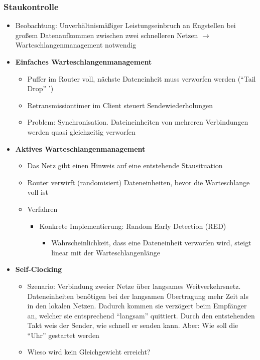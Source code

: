 \subsubsection{Staukontrolle}
\begin{itemize}
	\item Beobachtung: Unverhältnismäßiger Leistungseinbruch an Engstellen bei großem Datenaufkommen zwischen zwei schnelleren Netzen \(\rightarrow\) Warteschlangenmanagement notwendig
	\item \textbf{Einfaches Warteschlangenmanagement}
	\begin{itemize}
		\item Puffer im Router voll, nächste Dateneinheit muss verworfen werden ("`Tail Drop"'
		')
		\item Retransmissiontimer im Client steuert Sendewiederholungen
		\item Problem: Synchronisation. Dateineinheiten von mehreren Verbindungen werden quasi gleichzeitig verworfen
	\end{itemize}
	\item \textbf{Aktives Warteschlangenmanagement}
	\begin{itemize}
		\item Das Netz gibt einen Hinweis auf eine entstehende Stausituation
		\item Router verwirft (randomisiert) Dateneinheiten, bevor die Warteschlange voll ist
		\item Verfahren
		\begin{itemize}
			\item Konkrete Implementierung: Random Early Detection (RED)
			\begin{itemize}
				\item Wahrscheinlichkeit, dass eine Dateneinheit verworfen wird, steigt linear mit der Warteschlangenlänge
			\end{itemize}
		\end{itemize}
	\end{itemize}
	\item \textbf{Self-Clocking}
	\begin{itemize}
		\item Szenario: Verbindung zweier Netze über langsames Weitverkehrsnetz. Dateneinheiten benötigen bei der langsamen Übertragung mehr Zeit als in den lokalen Netzen. Dadurch kommen sie verzögert beim Empfänger an, welcher sie entsprechend "`langsam"' quittiert. Durch den entstehenden Takt weis der Sender, wie schnell er senden kann. Aber: Wie soll die "`Uhr"' gestartet werden
		\item Wieso wird kein Gleichgewicht erreicht?

\end{itemize}
\end{itemize}
